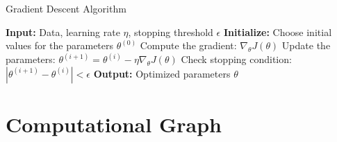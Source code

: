 \documentclass[final,letterpaper,twoside,12pt]{report}
\begin{document}
\begin{algorithm}
	\caption{Gradient Descent Algorithm}
	\begin{algorithmic}[1]
		\State \textbf{Input:} Data, learning rate \(\eta\), stopping threshold \(\epsilon\)
		\State \textbf{Initialize:} Choose initial values for the parameters \(\theta^{(0)}\)
		\Repeat
		\State Compute the gradient: \(\nabla_\theta J(\theta)\)
		\State Update the parameters: \(\theta^{(i+1)} = \theta^{(i)} - \eta \nabla_\theta J(\theta)\)
		\State Check stopping condition: \(\left|\theta^{(i+1)} - \theta^{(i)}\right| < \epsilon\)
		\State \textbf{Output:} Optimized parameters \(\theta\)
	\end{algorithmic}
\end{algorithm}


\chapter{Computational Graph}
\end{document}
